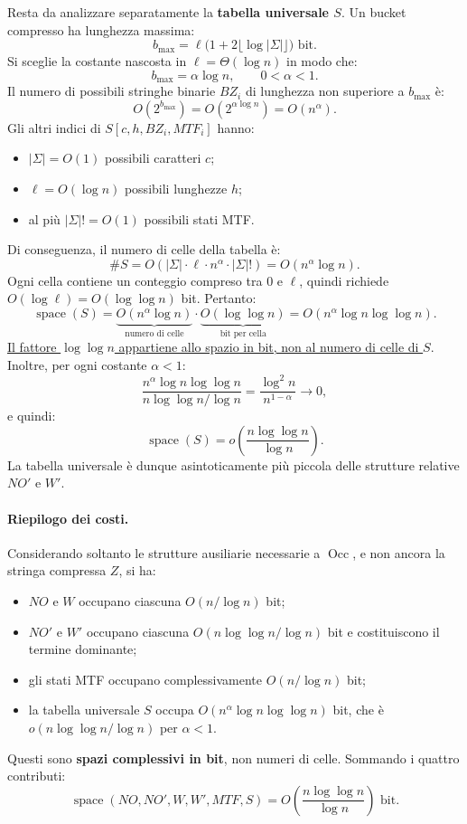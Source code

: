 \documentclass{article}
\theoremstyle{definition}
\numberwithin{equation}{section}
\begin{document}
Resta da analizzare separatamente la \textbf{tabella universale $S$}. Un bucket compresso ha lunghezza massima:
\[
    b_{\max}
    =
    \ell\bigl(1+2\lfloor\log|\Sigma|\rfloor\bigr)
    \text{ bit}.
\]
Si sceglie la costante nascosta in $\ell=\Theta(\log n)$ in modo che:
\[
    b_{\max}
    =
    \alpha\log n,
    \qquad
    0<\alpha<1.
\]
Il numero di possibili stringhe binarie $BZ_i$ di lunghezza non superiore a $b_{\max}$ è:
\[
    O(2^{b_{\max}})
    =
    O(2^{\alpha\log n})
    =
    O(n^\alpha).
\]
Gli altri indici di $S[c,h,BZ_i,MTF_i]$ hanno:
\begin{itemize}
    \item $|\Sigma|=O(1)$ possibili caratteri $c$;
    \item $\ell=O(\log n)$ possibili lunghezze $h$;
    \item al più $|\Sigma|!=O(1)$ possibili stati MTF.
\end{itemize}
Di conseguenza, il numero di celle della tabella è:
\[
    \#S
    =
    O\!\left(
    |\Sigma|
    \cdot
    \ell
    \cdot
    n^\alpha
    \cdot
    |\Sigma|!
    \right)
    =
    O(n^\alpha\log n).
\]
Ogni cella contiene un conteggio compreso tra $0$ e $\ell$, quindi richiede $O(\log\ell)=O(\log\log n)$ bit. Pertanto:
\[
    \operatorname{space}(S)
    =
    \underbrace{O(n^\alpha\log n)}_{\text{numero di celle}}
    \cdot
    \underbrace{O(\log\log n)}_{\text{bit per cella}}
    =
    O\!\left(n^\alpha\log n\log\log n\right).
\]
\uline{Il fattore $\log\log n$ appartiene allo spazio in bit, non al numero di celle di $S$}. Inoltre, per ogni costante $\alpha<1$:
\[
    \frac{
        n^\alpha\log n\log\log n
    }{
        n\log\log n/\log n
    }
    =
    \frac{\log^2 n}{n^{1-\alpha}}
    \longrightarrow
    0,
\]
e quindi:
\[
    \operatorname{space}(S)
    =
    o\!\left(\frac{n\log\log n}{\log n}\right).
\]
La tabella universale è dunque asintoticamente più piccola delle strutture relative $NO'$ e $W'$.

\paragraph{Riepilogo dei costi.}
Considerando soltanto le strutture ausiliarie necessarie a $\operatorname{Occ}$, e non ancora la stringa compressa $Z$, si ha:
\begin{itemize}
    \item $NO$ e $W$ occupano ciascuna $O(n/\log n)$ bit;
    \item $NO'$ e $W'$ occupano ciascuna $O(n\log\log n/\log n)$ bit e costituiscono il termine dominante;
    \item gli stati MTF occupano complessivamente $O(n/\log n)$ bit;
    \item la tabella universale $S$ occupa $O(n^\alpha\log n\log\log n)$ bit, che è $o(n\log\log n/\log n)$ per $\alpha<1$.
\end{itemize}
Questi sono \textbf{spazi complessivi in bit}, non numeri di celle. Sommando i quattro contributi:
\[
    \operatorname{space}(NO,NO',W,W',MTF,S)
    =
    O\!\left(\frac{n\log\log n}{\log n}\right)
    \text{ bit}.
\]
\end{document}
